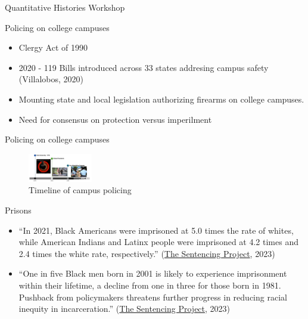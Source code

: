 \documentclass[
  ignorenonframetext,
]{beamer}
\begin{document}
\begin{frame}[fragile]{Quantitative Histories Workshop}
\begin{block}{Policing on college campuses}
\begin{itemize}[<+->]
  \begin{itemize}[<+->]
  \item
    Clergy Act of 1990
  \item
    2020 - 119 Bills introduced across 33 states addresing campus safety
    (Villalobos, 2020)
  \item
    Mounting state and local legislation authorizing firearms on college
    campuses.
  \item
    Need for consensus on protection versus imperilment
  \end{itemize}
\end{itemize}
\end{block}

\begin{block}{Policing on college campuses}
\protect\hypertarget{policing-on-college-campuses-1}{}
\begin{figure}
\centering
\includegraphics[width=0.25\textwidth,height=\textheight]{campus-policing-timeline.jpg}
\caption{Timeline of campus policing}
\end{figure}
\end{block}

\begin{block}{Prisons}
\protect\hypertarget{prisons}{}
\begin{itemize}[<+->]
\item
  ``In 2021, Black Americans were imprisoned at 5.0 times the rate of
  whites, while American Indians and Latinx people were imprisoned at
  4.2 times and 2.4 times the white rate, respectively.''
  (\href{https://www.sentencingproject.org/reports/one-in-five-ending-racial-inequity-in-incarceration/}{The
  Sentencing Project}, 2023)
\item
  ``One in five Black men born in 2001 is likely to experience
  imprisonment within their lifetime, a decline from one in three for
  those born in 1981. Pushback from policymakers threatens further
  progress in reducing racial inequity in incarceration.''
  (\href{https://www.sentencingproject.org/reports/one-in-five-ending-racial-inequity-in-incarceration/}{The
  Sentencing Project}, 2023)
\end{itemize}
\end{block}

\end{frame}
\end{document}
